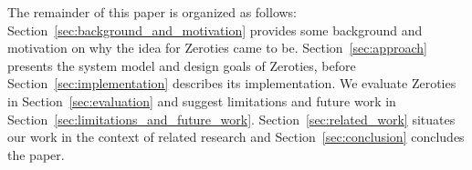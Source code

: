 The remainder of this paper is organized as follows: Section~\ref{sec:background_and_motivation} provides some background and motivation on why the idea for Zeroties came to be. Section~\ref{sec:approach} presents the system model and design goals of Zeroties, before Section~\ref{sec:implementation} describes its implementation. We evaluate Zeroties in Section~\ref{sec:evaluation} and suggest limitations and future work in Section~\ref{sec:limitations_and_future_work}. Section~\ref{sec:related_work} situates our work in the context of related research and Section~\ref{sec:conclusion} concludes the paper.


